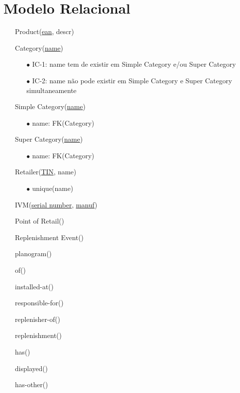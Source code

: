 \documentclass{article}
\begin{document}
	\section*{Modelo Relacional}
	\begin{itemize}

	 	\item[]{Product(\underline{ean}, descr)}

	 	\item[]{Category(\underline{name})}
		\begin{itemize}
			\item[$\bullet$]{IC-1: name tem de existir em Simple Category e/ou Super Category}
			\item[$\bullet$]{IC-2: name não pode existir em Simple Category e Super Category simultaneamente}
		\end{itemize}

	 	\item[]{Simple Category(\underline{name})}
		\begin{itemize}
			\item[$\bullet$]{name: FK(Category)}
		\end{itemize}

	 	\item[]{Super Category(\underline{name})}
		\begin{itemize}
			\item[$\bullet$]{name: FK(Category)}
		\end{itemize}

	 	\item[]{Retailer(\underline{TIN}, name)}
		\begin{itemize}
			\item[$\bullet$]{unique(name)}
		\end{itemize}

		\item[]{IVM(\underline{serial number}, \underline{manuf})}

		\item[]{Point of Retail()}

		\item[]{Replenishment Event()}

		\item[]{planogram()}

		\item[]{of()}

		\item[]{installed-at()}

		\item[]{responsible-for()}

		\item[]{replenisher-of()}

		\item[]{replenishment()}

		\item[]{has()}

		\item[]{displayed()}

		\item[]{has-other()}

	\end{itemize}
\end{document}
